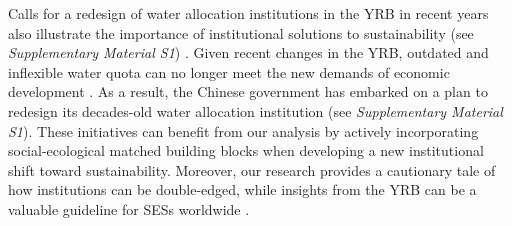 Calls for a redesign of water allocation institutions in the YRB in recent years also illustrate the importance of institutional solutions to sustainability (see \textit{Supplementary Material S1}) \cite{yu2019}.
Given recent changes in the YRB, outdated and inflexible water quota can no longer meet the new demands of economic development \cite{wang2019a}.
As a result, the Chinese government has embarked on a plan to redesign its decades-old water allocation institution (see \textit{Supplementary Material S1}).
These initiatives can benefit from our analysis by actively incorporating social-ecological matched building blocks when developing a new institutional shift toward sustainability.
Moreover, our research provides a cautionary tale of how institutions can be double-edged, while insights from the YRB can be a valuable guideline for SESs worldwide \cite{cumming2020b, muneepeerakul2017, cumming2020a, leslie2015}.
